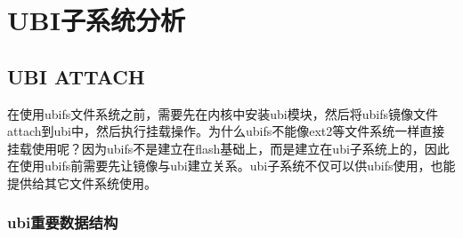\chapter{UBI子系统分析}
\section{UBI ATTACH}
在使用ubifs文件系统之前，需要先在内核中安装ubi模块，然后将ubifs镜像文件attach到ubi中，然后执行挂载操作。为什么ubifs不能像ext2等文件系统一样直接挂载使用呢？因为ubifs不是建立在flash基础上，而是建立在ubi子系统上的，因此在使用ubifs前需要先让镜像与ubi建立关系。ubi子系统不仅可以供ubifs使用，也能提供给其它文件系统使用。

\subsection{ubi重要数据结构}
